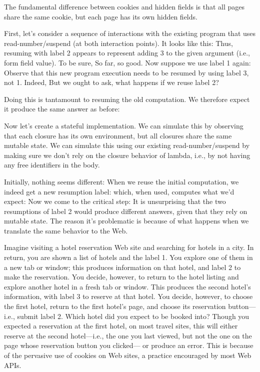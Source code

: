 
The fundamental difference between cookies and hidden fields is that all pages
share the same cookie, but each page has its own hidden fields.

First, let’s consider a sequence of interactions with the existing program that
uses read-number/suspend (at both interaction points). It looks like this:
Thus, resuming with label 2 appears to represent adding 3 to the given argument
(i.e., form field value). To be sure,
So far, so good. Now suppose we use label 1 again:
Observe that this new program execution needs to be resumed by using label 3,
not 1.
Indeed,
But we ought to ask, what happens if we reuse label 2?


Doing this is tantamount to resuming the old computation. We therefore expect it
produce the same answer as before:

Now let’s create a stateful implementation. We can simulate this by observing
that each closure has its own environment, but all closures share the same
mutable state. We can simulate this using our existing read-number/suspend by
making sure we don’t rely on the closure behavior of lambda, i.e., by not having
any free identifiers in the body.



Initially, nothing seems different:
When we reuse the initial computation, we indeed get a new resumption label:
which, when used, computes what we’d expect:
Now we come to the critical step:
It is unsurprising that the two resumptions of label 2 would produce different
answers, given that they rely on mutable state. The reason it’s problematic is
because of what happens when we translate the same behavior to the Web.

Imagine visiting a hotel reservation Web site and searching for hotels in a
city. In return, you are shown a list of hotels and the label 1. You explore one
of them in a new tab or window; this produces information on that hotel, and
label 2 to make the reservation. You decide, however, to return to the hotel
listing and explore another hotel in a fresh tab or window. This produces the
second hotel’s information, with label 3 to reserve at that hotel. You decide,
however, to choose the first hotel, return to the first hotel’s page, and choose
its reservation button—i.e., submit label 2. Which hotel did you expect to be
booked into? Though you expected a reservation at the first hotel, on most
travel sites, this will either reserve at the second hotel—i.e., the one you
last viewed, but not the one on the page whose reservation button you clicked—
or produce an error. This is because of the pervasive use of cookies on Web
sites, a practice encouraged by most Web APIs.
